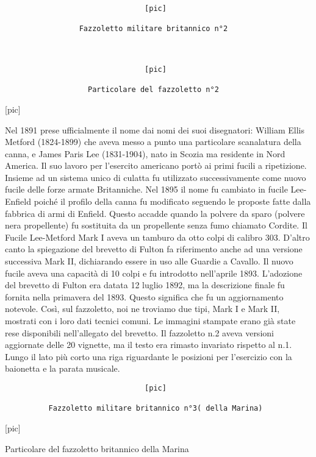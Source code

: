 \begin{verbatim}
                                [pic]

                 Fazzoletto militare britannico n°2



                                [pic]

                   Particolare del fazzoletto n°2
\end{verbatim}

{[}pic{]}

Nel 1891 prese ufficialmente il nome dai nomi dei suoi disegnatori:
William Ellis Metford (1824-1899) che aveva messo a punto una
particolare scanalatura della canna, e James Paris Lee (1831-1904), nato
in Scozia ma residente in Nord America. Il suo lavoro per l'esercito
americano portò ai primi fucili a ripetizione. Insieme ad un sistema
unico di culatta fu utilizzato successivamente come nuovo fucile delle
forze armate Britanniche. Nel 1895 il nome fu cambiato in fucile
Lee-Enfield poiché il profilo della canna fu modificato seguendo le
proposte fatte dalla fabbrica di armi di Enfield. Questo accadde quando
la polvere da sparo (polvere nera propellente) fu sostituita da un
propellente senza fumo chiamato Cordite. Il Fucile Lee-Metford Mark I
aveva un tamburo da otto colpi di calibro 303. D'altro canto la
spiegazione del brevetto di Fulton fa riferimento anche ad una versione
successiva Mark II, dichiarando essere in uso alle Guardie a Cavallo. Il
nuovo fucile aveva una capacità di 10 colpi e fu introdotto nell'aprile
1893. L'adozione del brevetto di Fulton era datata 12 luglio 1892, ma la
descrizione finale fu fornita nella primavera del 1893. Questo significa
che fu un aggiornamento notevole. Così, sul fazzoletto, noi ne troviamo
due tipi, Mark I e Mark II, mostrati con i loro dati tecnici comuni. Le
immagini stampate erano già state rese disponibili nell'allegato del
brevetto. Il fazzoletto n.2 aveva versioni aggiornate delle 20 vignette,
ma il testo era rimasto invariato rispetto al n.1. Lungo il lato più
corto una riga riguardante le posizioni per l'esercizio con la baionetta
e la parata musicale.

\begin{verbatim}
                                [pic]

          Fazzoletto militare britannico n°3( della Marina)
\end{verbatim}

{[}pic{]}

Particolare del fazzoletto britannico della Marina

